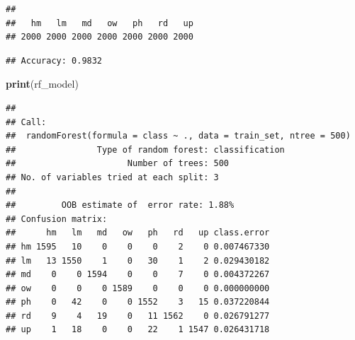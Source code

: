 \documentclass[
]{article}
\newenvironment{Shaded}{\begin{snugshade}}{\end{snugshade}}
\newcommand{\AttributeTok}[1]{\textcolor[rgb]{0.13,0.29,0.53}{#1}}
\newcommand{\CommentTok}[1]{\textcolor[rgb]{0.56,0.35,0.01}{\textit{#1}}}
\newcommand{\DecValTok}[1]{\textcolor[rgb]{0.00,0.00,0.81}{#1}}
\newcommand{\FloatTok}[1]{\textcolor[rgb]{0.00,0.00,0.81}{#1}}
\newcommand{\FunctionTok}[1]{\textcolor[rgb]{0.13,0.29,0.53}{\textbf{#1}}}
\newcommand{\NormalTok}[1]{#1}
\newcommand{\OtherTok}[1]{\textcolor[rgb]{0.56,0.35,0.01}{#1}}
\newcommand{\SpecialCharTok}[1]{\textcolor[rgb]{0.81,0.36,0.00}{\textbf{#1}}}
\newcommand{\StringTok}[1]{\textcolor[rgb]{0.31,0.60,0.02}{#1}}
\begin{document}
\begin{verbatim}
## 
##   hm   lm   md   ow   ph   rd   up 
## 2000 2000 2000 2000 2000 2000 2000
\end{verbatim}

\begin{Shaded}
\end{Shaded}

\begin{verbatim}
## Accuracy: 0.9832
\end{verbatim}

\begin{Shaded}
\begin{Highlighting}[]
\FunctionTok{print}\NormalTok{(rf\_model)}
\end{Highlighting}
\end{Shaded}

\begin{verbatim}
## 
## Call:
##  randomForest(formula = class ~ ., data = train_set, ntree = 500) 
##                Type of random forest: classification
##                      Number of trees: 500
## No. of variables tried at each split: 3
## 
##         OOB estimate of  error rate: 1.88%
## Confusion matrix:
##      hm   lm   md   ow   ph   rd   up class.error
## hm 1595   10    0    0    0    2    0 0.007467330
## lm   13 1550    1    0   30    1    2 0.029430182
## md    0    0 1594    0    0    7    0 0.004372267
## ow    0    0    0 1589    0    0    0 0.000000000
## ph    0   42    0    0 1552    3   15 0.037220844
## rd    9    4   19    0   11 1562    0 0.026791277
## up    1   18    0    0   22    1 1547 0.026431718
\end{verbatim}
\end{document}
